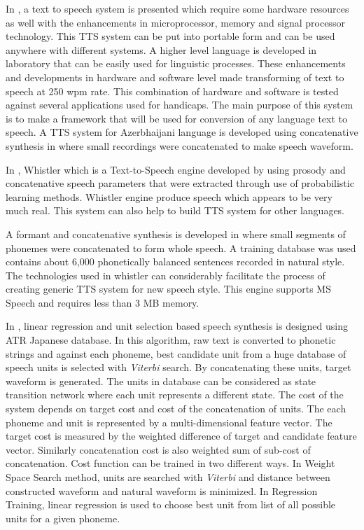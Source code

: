 In \cite{carlson1982multi}, a text to speech system is presented which require some hardware resources as well with the enhancements in microprocessor, 
memory and signal processor technology. This TTS system can be put into portable form and can be used anywhere with different systems. A higher level language is
developed in laboratory that can be easily used for linguistic processes. These enhancements and developments in hardware
and software level made transforming of text to speech at 250 wpm rate. This combination of hardware and software is tested
against several applications used for handicaps. The main purpose of this system is to make a framework that will
be used for conversion of any language text to speech. A TTS system for Azerbhaijani language is developed using concatenative
synthesis in \cite{aida2010main} where small recordings were concatenated to make speech waveform.

In \cite{huang1996whistler}, Whistler which is a Text-to-Speech engine developed by using prosody and
concatenative speech parameters that were extracted through use of probabilistic learning methods. Whistler engine produce
speech which appears to be very much real. This system can also help to build TTS system for other languages.

A formant and concatenative synthesis is developed in \cite{huang1997recent}
where small segments of phonemes were concatenated to form whole speech. A training database was used contains about 6,000 phonetically balanced sentences recorded in natural style. The technologies used in whistler can considerably facilitate the
process of creating generic TTS system for new speech style. This engine supports MS Speech and requires less than 3 MB memory.

In \cite{hunt1996unit}, linear regression and unit selection 
based speech synthesis is designed using ATR Japanese database. In this algorithm, raw text is converted to phonetic strings and against each phoneme, best candidate unit from a huge database of speech units is selected with \textit{Viterbi} search. By concatenating these units, target waveform is generated. The units in database can be considered as state transition network where each unit represents a different state. The cost of the system depends on target cost and cost of the concatenation of units. The each phoneme and unit is represented by a multi-dimensional feature vector. The target cost is measured by the weighted difference of target and candidate feature vector. Similarly concatenation cost is also weighted sum of sub-cost of concatenation. Cost function can be trained in two different ways. In Weight Space Search method, units are searched with \textit{Viterbi} and distance between constructed waveform and
natural waveform is minimized. In Regression Training, linear regression is used to choose best unit from list of all possible
units for a given phoneme. 


